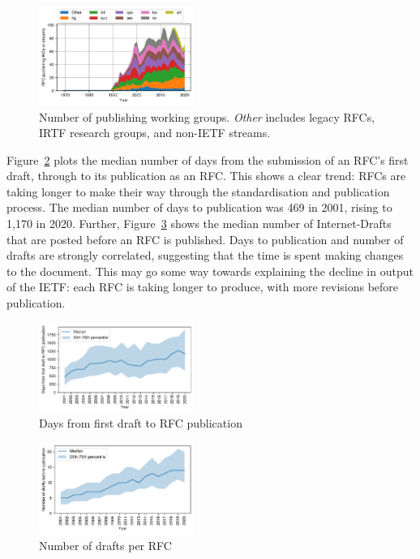 \documentclass[twocolumn,10pt]{article}
\begin{document}
\begin{figure}
\includegraphics[width=0.45\textwidth]{figures-prev/imc-2021/documents/unique_wgs_per_year_areas.pdf}
\caption{Number of publishing working groups. \textit{Other} includes legacy RFCs, IRTF research groups, and non-IETF streams.}
\label{fig:pub_wgs_yearly}
\end{figure}

Figure~\ref{fig:rfcs_days_to_pub} plots the median number of days from the
submission of an RFC's first draft, through to its publication as an RFC.
This shows a clear trend: RFCs are taking longer to make their way through
the standardisation and publication process. The median number of days to
publication was 469 in 2001, rising to 1,170 in 2020. Further,
Figure~\ref{fig:drafts_year} shows the median number of Internet-Drafts
that are posted before an RFC is published. Days to publication and number
of drafts are strongly correlated, suggesting that the time is spent making
changes to the document. This may go some way towards explaining the
decline in output of the IETF: each RFC is taking longer to produce, with
more revisions before publication. 

\begin{figure}
\includegraphics[width=0.45\textwidth]{figures-prev/imc-2021/documents/day_counts_yearly.pdf}
\caption{Days from first draft to RFC publication}
\label{fig:rfcs_days_to_pub}
\end{figure}

\begin{figure}
\includegraphics[width=0.45\textwidth]{figures-prev/imc-2021/documents/draft_counts_yearly.pdf}
\caption{Number of drafts per RFC}
\label{fig:drafts_year}
\end{figure}
\end{document}

